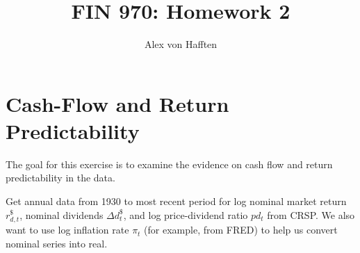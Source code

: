 \documentclass{article}
\title{FIN 970: Homework 2}
\author{Alex von Hafften }
\begin{document}
\maketitle


\section{Cash-Flow and Return Predictability}

The goal for this exercise is to examine the evidence on cash flow and return predictability in the data.

\bigskip

Get annual data from 1930 to most recent period for log nominal market return $r_{d,t}^{\$}$, nominal dividends $\Delta d_{t}^{\$}$, and log price-dividend ratio $pd_t$ from CRSP. We also want to use log inflation rate $\pi_t$ (for example, from FRED) to help us convert nominal series into real.
\end{document}
